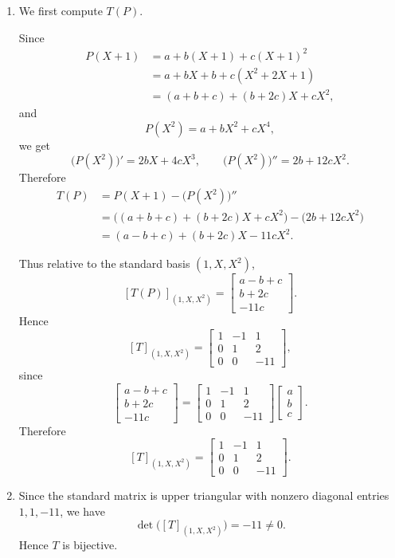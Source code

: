 \documentclass[12pt]{article}
\begin{document}
\begin{enumerate}[label=(\alph*)]
\item We first compute \(T(P)\).

Since
\begin{align*}
P(X+1)
&=a+b(X+1)+c(X+1)^2\\
&=a+bX+b+c(X^2+2X+1)\\
&=(a+b+c)+(b+2c)X+cX^2,
\end{align*}
and
\[
P(X^2)=a+bX^2+cX^4,
\]
we get
\[
\bigl(P(X^2)\bigr)'=2bX+4cX^3,
\qquad
\bigl(P(X^2)\bigr)''=2b+12cX^2.
\]
Therefore
\begin{align*}
T(P)
&=P(X+1)-\bigl(P(X^2)\bigr)''\\
&=\bigl((a+b+c)+(b+2c)X+cX^2\bigr)-\bigl(2b+12cX^2\bigr)\\
&=(a-b+c)+(b+2c)X-11cX^2.
\end{align*}

Thus relative to the standard basis \((1,X,X^2)\),
\[
[T(P)]_{(1,X,X^2)}
=
\begin{bmatrix}
a-b+c\\
b+2c\\
-11c
\end{bmatrix}.
\]
Hence
\[
[T]_{(1,X,X^2)}
=
\begin{bmatrix}
1 & -1 & 1\\
0 & 1 & 2\\
0 & 0 & -11
\end{bmatrix},
\]
since
\[
\begin{bmatrix}
a-b+c\\
b+2c\\
-11c
\end{bmatrix}
=
\begin{bmatrix}
1 & -1 & 1\\
0 & 1 & 2\\
0 & 0 & -11
\end{bmatrix}
\begin{bmatrix}
a\\b\\c
\end{bmatrix}.
\]
Therefore
\[
\boxed{
[T]_{(1,X,X^2)}
=
\begin{bmatrix}
1 & -1 & 1\\
0 & 1 & 2\\
0 & 0 & -11
\end{bmatrix}.}
\]
\newpage
\item Since the standard matrix is upper triangular with nonzero diagonal entries \(1,1,-11\), we have
\[
\det\bigl([T]_{(1,X,X^2)}\bigr)=-11\neq 0.
\]
Hence \(T\) is bijective.


\end{enumerate}
\end{document}
